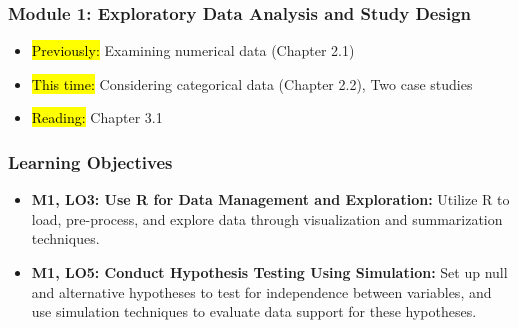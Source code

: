 
\begin{frame}
    \frametitle{Module 1: Exploratory Data Analysis and Study Design}
    \begin{itemize}
        \item \hl{Previously: }Examining numerical data (Chapter 2.1)
        \item \hl{This time: }Considering categorical data (Chapter 2.2), Two case studies
        \item \hl{Reading: }Chapter 3.1
    \end{itemize}

\end{frame}
\begin{frame}
    \frametitle{Learning Objectives}
    \begin{itemize}
        \item \textbf{M1, LO3: Use R for Data Management and Exploration:} Utilize R to load, pre-process, and explore data through visualization and summarization techniques.
        \item \textbf{M1, LO5: Conduct Hypothesis Testing Using Simulation:} Set up null and alternative hypotheses to test for independence between variables, and use simulation techniques to evaluate data support for these hypotheses.
    \end{itemize}
\end{frame}
